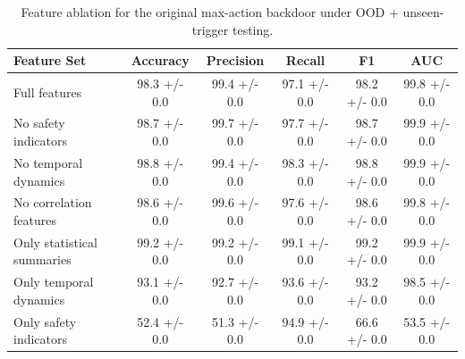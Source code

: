 \begin{table}[t]
\centering
\begin{tabular}{lccccc}
\hline
Feature Set & Accuracy & Precision & Recall & F1 & AUC \\
\hline
Full features & 98.3 +/- 0.0 & 99.4 +/- 0.0 & 97.1 +/- 0.0 & 98.2 +/- 0.0 & 99.8 +/- 0.0 \\
No safety indicators & 98.7 +/- 0.0 & 99.7 +/- 0.0 & 97.7 +/- 0.0 & 98.7 +/- 0.0 & 99.9 +/- 0.0 \\
No temporal dynamics & 98.8 +/- 0.0 & 99.4 +/- 0.0 & 98.3 +/- 0.0 & 98.8 +/- 0.0 & 99.9 +/- 0.0 \\
No correlation features & 98.6 +/- 0.0 & 99.6 +/- 0.0 & 97.6 +/- 0.0 & 98.6 +/- 0.0 & 99.8 +/- 0.0 \\
Only statistical summaries & 99.2 +/- 0.0 & 99.2 +/- 0.0 & 99.1 +/- 0.0 & 99.2 +/- 0.0 & 99.9 +/- 0.0 \\
Only temporal dynamics & 93.1 +/- 0.0 & 92.7 +/- 0.0 & 93.6 +/- 0.0 & 93.2 +/- 0.0 & 98.5 +/- 0.0 \\
Only safety indicators & 52.4 +/- 0.0 & 51.3 +/- 0.0 & 94.9 +/- 0.0 & 66.6 +/- 0.0 & 53.5 +/- 0.0 \\
\hline
\end{tabular}
\caption{Feature ablation for the original max-action backdoor under OOD + unseen-trigger testing.}
\label{tab:feature_ablation_robustness}
\end{table}
